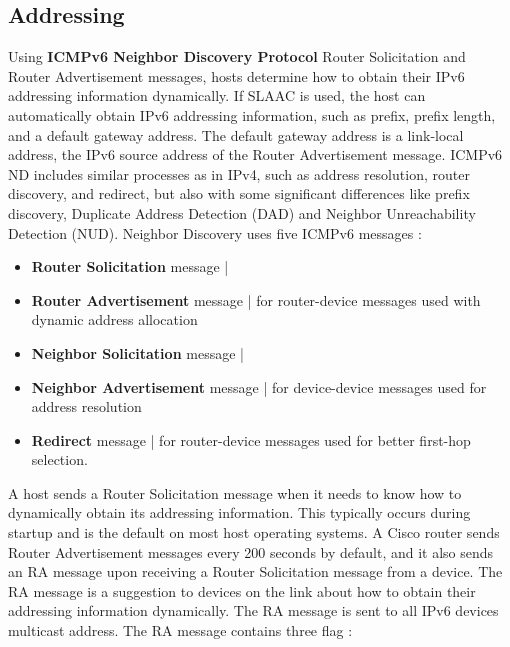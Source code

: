 \documentclass[11pt]{article}
\begin{document}
\subsection{Addressing}
Using \textbf{ICMPv6 Neighbor Discovery Protocol} Router Solicitation and Router Advertisement messages, hosts determine how to obtain their IPv6 addressing information dynamically. If SLAAC is used, the host can automatically obtain IPv6 addressing information, such as prefix, prefix length, and a default gateway address. The default gateway address is a link-local address, the IPv6 source address of the Router Advertisement message. ICMPv6 ND includes similar processes as in IPv4,  such as address resolution, router discovery, and redirect, but also with some significant differences like prefix discovery, Duplicate Address Detection (DAD) and Neighbor Unreachability Detection (NUD). Neighbor Discovery uses five ICMPv6 messages :
\begin{itemize}
\item \textbf{Router Solicitation} message  |
\item \textbf{Router Advertisement} message | for router-device messages used with dynamic address allocation
\item \textbf{Neighbor Solicitation} message  |
\item \textbf{Neighbor Advertisement} message | for device-device messages used for address resolution
\item \textbf{Redirect} message | for router-device messages used for better first-hop selection.  
\end{itemize}  
A host sends a Router Solicitation message when it needs to know how to dynamically obtain its addressing information. This typically occurs during startup and is the default on most host operating systems. A Cisco router sends Router Advertisement messages every 200 seconds by default, and it also sends an RA message upon receiving a Router Solicitation message from a device. The RA message is a suggestion to devices on the link about how to obtain their addressing information dynamically. The RA
message is sent to all IPv6 devices multicast address. The RA message contains three flag :
\end{document}
